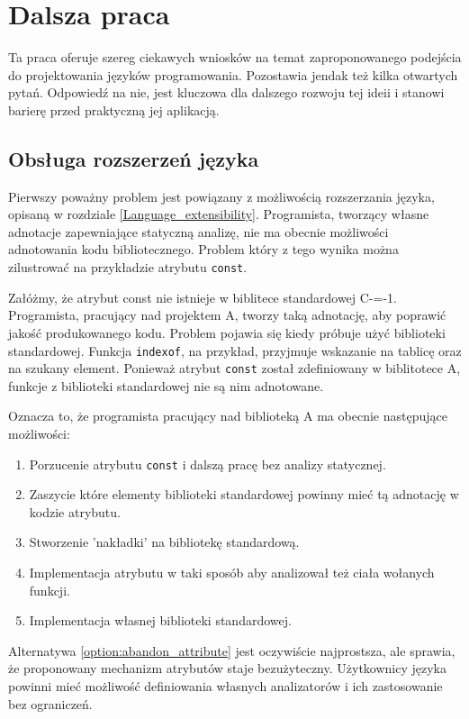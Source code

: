 \section{Dalsza praca}

Ta praca oferuje szereg ciekawych wniosków na temat zaproponowanego podejścia do projektowania języków programowania.
Pozostawia jendak też kilka otwartych pytań.
Odpowiedź na nie, jest kluczowa dla dalszego rozwoju tej ideii i stanowi barierę przed praktyczną jej aplikacją.

\subsection{Obsługa rozszerzeń języka}
Pierwszy poważny problem jest powiązany z możliwością rozszerzania języka, opisaną w rozdziale \ref{Language_extensibility}.
Programista, tworzący własne adnotacje zapewniające statyczną analizę, nie ma obecnie możliwości adnotowania kodu bibliotecznego.
Problem który z tego wynika można zilustrować na przykładzie atrybutu \lstinline{const}.

Załóżmy, że atrybut const nie istnieje w biblitece standardowej C-=-1.
Programista, pracujący nad projektem A, tworzy taką adnotację, aby poprawić jakość produkowanego kodu.
Problem pojawia się kiedy próbuje użyć biblioteki standardowej.
Funkcja \lstinline{indexof}, na przykład, przyjmuje wskazanie na tablicę oraz na szukany element.
Ponieważ atrybut \lstinline{const} został zdefiniowany w biblitotece A, funkcje z biblioteki standardowej nie są nim adnotowane.

Oznacza to, że programista pracujący nad biblioteką A ma obecnie następujące możliwości:
\begin{enumerate}
	\item\label{option:abandon_attribute} Porzucenie atrybutu \lstinline{const} i dalszą pracę bez analizy statycznej.
	\item\label{option:embed_in_attribute} Zaszycie które elementy biblioteki standardowej powinny mieć tą adnotację w kodzie atrybutu.
	\item\label{option:std_library_fascade} Stworzenie 'nakładki' na bibliotekę standardową.%
	\item\label{option:analize_function_bodies} Implementacja atrybutu w taki sposób aby analizował też ciała wołanych funkcji.
	\item\label{option:own_std_lib} Implementacja własnej biblioteki standardowej.
\end{enumerate}
Alternatywa \ref{option:abandon_attribute} jest oczywiście najprostsza, ale sprawia, że proponowany mechanizm atrybutów staje bezużyteczny. 
Użytkownicy języka powinni mieć możliwość definiowania własnych analizatorów i ich zastosowanie bez ograniczeń.

